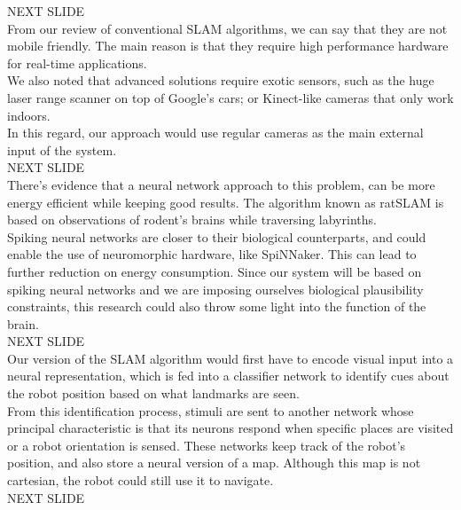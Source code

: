 \documentclass[12t,a4paper]{memoir}
\begin{document}
{\Large NEXT SLIDE}\\

From our review of conventional SLAM algorithms, we can say that they are not mobile friendly. The main reason is that they require high performance hardware for real-time applications.\\

We also noted that advanced solutions require exotic sensors, such as the huge laser range scanner on top of Google's cars; or Kinect-like cameras that only work indoors.\\

In this regard, our approach would use regular cameras as the main external input of the system.\\

{\Large NEXT SLIDE}\\

There's evidence that a neural network approach to this problem, can be more energy efficient while keeping good results. The algorithm known as ratSLAM is based on observations of rodent's brains while traversing labyrinths.\\

Spiking neural networks are closer to their biological counterparts, and could enable the use of neuromorphic hardware, like SpiNNaker. This can lead to further reduction on energy consumption. Since our system will be based on spiking neural networks and we are imposing ourselves biological plausibility constraints, this research could also throw some light into the function of the brain.\\

{\Large NEXT SLIDE}\\

Our version of the SLAM algorithm would first have to encode visual input into a  neural representation, which is fed into a classifier network to identify cues about the robot position based on what landmarks are seen.\\

From this identification process, stimuli are sent to another network whose principal characteristic is that its neurons respond when specific places are visited or a robot orientation is sensed. These networks keep track of the robot's position, and also store a neural version of a map. Although this map is not cartesian, the robot could still use it to navigate.\\

{\Large NEXT SLIDE}\\
\end{document}
